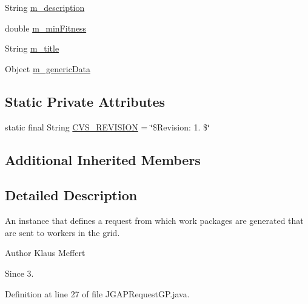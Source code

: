 \begin{DoxyCompactItemize}
\item 
String \hyperlink{classorg_1_1jgap_1_1distr_1_1grid_1_1gp_1_1_j_g_a_p_request_g_p_a2f4fc93b15617d582c175418b4ec3ed5}{m\-\_\-description}
\item 
double \hyperlink{classorg_1_1jgap_1_1distr_1_1grid_1_1gp_1_1_j_g_a_p_request_g_p_a0b3c6c24906fb1af0a86f0afdd4b4a47}{m\-\_\-min\-Fitness}
\item 
String \hyperlink{classorg_1_1jgap_1_1distr_1_1grid_1_1gp_1_1_j_g_a_p_request_g_p_ac44bc0ed6131af88f42c7c35903c87ae}{m\-\_\-title}
\item 
Object \hyperlink{classorg_1_1jgap_1_1distr_1_1grid_1_1gp_1_1_j_g_a_p_request_g_p_a88d4babc1e8ebddea8e8e4110723cc3c}{m\-\_\-generic\-Data}
\end{DoxyCompactItemize}
\subsection*{Static Private Attributes}
\begin{DoxyCompactItemize}
\item 
static final String \hyperlink{classorg_1_1jgap_1_1distr_1_1grid_1_1gp_1_1_j_g_a_p_request_g_p_a11a85eb54897ef56353e9cc2cbebb5f4}{C\-V\-S\-\_\-\-R\-E\-V\-I\-S\-I\-O\-N} = \char`\"{}\$Revision\-: 1. \$\char`\"{}
\end{DoxyCompactItemize}
\subsection*{Additional Inherited Members}


\subsection{Detailed Description}
An instance that defines a request from which work packages are generated that are sent to workers in the grid.

\begin{DoxyAuthor}{Author}
Klaus Meffert 
\end{DoxyAuthor}
\begin{DoxySince}{Since}
3. 
\end{DoxySince}


Definition at line 27 of file J\-G\-A\-P\-Request\-G\-P.\-java.



